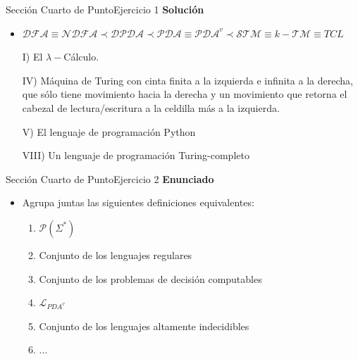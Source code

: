 \documentclass[10pt, envcountsect, presentation, aspectratio=169]{beamer}
\newcommand{\lpdav}{\ensuremath{\mathcal L_{PDA^v}}}
\begin{document}
\begin{frame}{Sección Cuarto de Punto}{Ejercicio 1}
    \textbf{Solución}\\
    \begin{itemize}
        \item $\mathcal{DFA} \equiv \mathcal{NDFA} \prec \mathcal{DPDA} \prec \mathcal{PDA} \equiv \mathcal{PDA}^v \prec \mathcal{STM} \equiv k-\mathcal{TM} \equiv TCL$
        \item[I)] El $\lambda-$Cálculo.
        \item[IV)] Máquina de Turing con cinta finita a la izquierda e infinita a la derecha, que sólo tiene movimiento hacia la derecha y un movimiento que retorna el cabezal de lectura/escritura a la celdilla más a la izquierda.
        \item[V)] El lenguaje de programación Python
        \item[VIII)] Un lenguaje de programación Turing-completo 
    \end{itemize}
\end{frame}


\begin{frame}{Sección Cuarto de Punto}{Ejercicio 2}
\textbf{Enunciado}
	\begin{itemize}
        \item Agrupa juntas las siguientes definiciones equivalentes:
        \begin{enumerate}[1.]
            \item $\mathcal{P}( \Sigma ^ *)$
            \item Conjunto de los lenguajes regulares
            \item Conjunto de los problemas de decisión computables
            \item $\lpdav$
            \item Conjunto de los lenguajes altamente indecidibles
            \item ...
        \end{enumerate}
	\end{itemize}
\end{frame}

\end{document}
